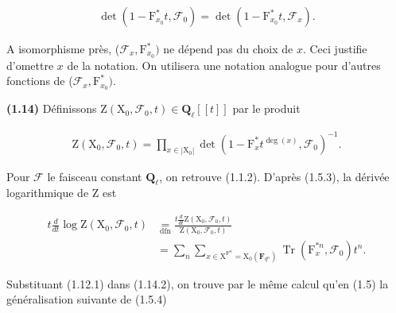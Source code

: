\documentclass[10pt,leqno]{article}
\begin{document}
\begin{equation*}\begin{gathered}\operatorname{det}(1- \mathrm{F}_{x_{0}}^{*}t,\mathcal{F} _{0}) = \operatorname{det}(1- \mathrm{F}_{x_{0}}^{*}t,\mathcal{F} _{x}).\end{gathered}\end{equation*}

\noindent A isomorphisme près, (\(\mathcal{F} _{x},\mathrm{F}_{x_{0}}^{*})\) ne dépend pas du choix de \(x\). Ceci justifie d’omettre \(x\) de la notation. On utilisera une notation analogue pour d’autres fonctions de (\(\mathcal{F} _{x},\mathrm{F}_{x_{0}}^{*})\).\par

\clearpage

\label{physical-8}

\noindent \textbf{(1.14)} Définissons \(\mathrm{Z}(\mathrm{X}_{0},\mathcal{F} _{0},t)\in \mathbf{Q}_{\ell }[[t]]\) par le produit\par

\begin{equation*}\begin{gathered}\mathrm{Z}(\mathrm{X}_{0},\mathcal{F} _{0},t) = \prod _{x\in |\mathrm{X}_{0}|} \operatorname{det}(1- \mathrm{F}_{x}^{*}t^{\operatorname{deg}(x)},\mathcal{F} _{0})^{- 1}.\end{gathered}\tag{1.14.1}\end{equation*}

\noindent Pour \(\mathcal{F} \) le faisceau constant \(\mathbf{Q}_{\ell }\), on retrouve (1.1.2). D’après (1.5.3), la dérivée logarithmique de \(\mathrm{Z}\) est\par

\begin{equation*}\begin{aligned}
t\frac{d}{dt}\log\mathrm Z(\mathrm X_0,\mathcal F_0,t)
&\underset{\mathrm{dfn}}{=}\frac{t\frac{d}{dt}\mathrm Z(\mathrm X_0,\mathcal F_0,t)}{\mathrm Z(\mathrm X_0,\mathcal F_0,t)}\\
&=\sum_n\sum_{x\in\mathrm X^{\mathrm F^n}=\mathrm X_0(\mathbf F_{q^n})}\operatorname{Tr}(\mathrm F_x^{*n},\mathcal F_0)t^n.
\end{aligned}\tag{1.14.2}\end{equation*}

\noindent Substituant (1.12.1) dans (1.14.2), on trouve par le même calcul qu’en (1.5) la généralisation suivante de (1.5.4)\par
\end{document}
